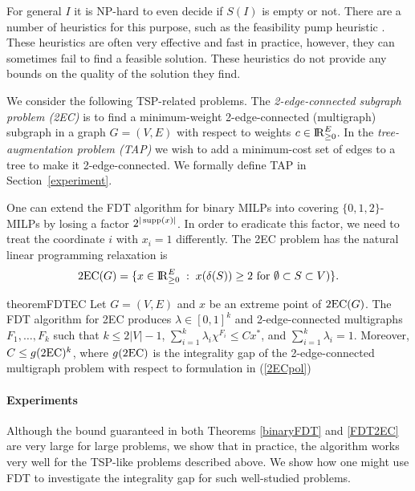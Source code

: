 For general $I$ it is NP-hard to even decide if $S(I)$ is empty or not. There are a number of heuristics for this purpose, such as the feasibility pump heuristic \cite{fp1,fp2}. These heuristics are often very effective and fast in practice, however, they can sometimes fail to find a feasible solution. These heuristics do not provide any bounds on the quality of the solution they find. 

We consider the following TSP-related problems.  The {\em 2-edge-connected subgraph problem (2EC)} is to find a minimum-weight 2-edge-connected (multigraph) subgraph
in a graph $G=(V,E)$ with respect to weights $c\in {\rm I\!R}^E_{\geq 0}$. In the {\em tree-augmentation problem (TAP)} we wish to add a minimum-cost set of edges to a tree to make it 2-edge-connected.  We formally define TAP in Section~\ref{experiment}.

One can extend the FDT algorithm for binary MILPs into covering $\{0,1,2\}$-MILPs by losing a factor $2^{|\operatorname{supp}(x)|}$. In order to eradicate this factor, we need to treat the coordinate $i$ with $x_i=1$ differently. The 2EC problem has the natural linear programming relaxation is
\begin{equation}\label{2ECpol}
\operatorname{2EC}(G)= \{x\in {\rm I\!R}_{\geq 0}^{E}\;:\; x(\delta(S))\geq 2 \text{ for $\emptyset \subset S\subset V$})\}.\end{equation}

\begin{restatable}{theorem}{FDTEC}
	\label{FDT2EC}
	Let $G=(V,E)$ and $x$ be an extreme point of  $\operatorname{2EC}(G)$. The FDT algorithm for 2EC produces $\lambda\in [0,1]^k$ and 2-edge-connected multigraphs $F_1,\ldots,F_k$ such that $k\leq 2|V|-1$, $\sum_{i=1}^{k}\lambda_i \chi^{F_i}\leq Cx^*$, and $\sum_{i=1}^{k}\lambda_i = 1$. Moreover, $C\leq g({\operatorname{2EC}})^{k}$, where $g({\operatorname{2EC}})$ is the integrality gap of the 2-edge-connected multigraph problem with respect to formulation in (\ref{2ECpol}) 
\end{restatable}

\paragraph{Experiments} Although the bound guaranteed in both Theorems \ref{binaryFDT} and \ref{FDT2EC} are very large for large problems, we show that in practice, the algorithm works very well for the TSP-like problems described above. We show how one might use FDT to investigate the integrality gap for such well-studied problems.


